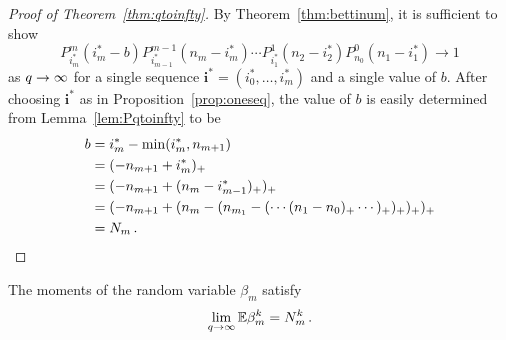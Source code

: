 
\begin{proof}[Proof of Theorem~\ref{thm:qtoinfty}]
  By Theorem~\ref{thm:bettinum}, it is sufficient to show
  \[
    P^m_{i_m^\ast}(i_m^\ast-b) P_{i^\ast_{m-1}}^{m-1}\left(n_{m} -i_m^\ast\right) \cdots
    P_{i_1^\ast}^1\left(n_2 - i_2^\ast\right) P_{n_0}^0 \left(n_1 - i_1^\ast\right) \to 1 
  \]
  as $q \rightarrow \infty$ for a single sequence $\mathbf{i}^\ast=(i_0^\ast, \ldots,
  i_m^\ast)$ and a single
  value of $b$. After choosing $\mathbf{i}^\ast$ as in Proposition~\ref{prop:oneseq},
  the value of $b$ is easily determined from Lemma~\ref{lem:Pqtoinfty} to be
	\begin{align*}
	b 	&= i_m^\ast - \min(i_m^\ast, n_{m+1})\\
		&= (-n_{m+1} + i_m^\ast)_+\\
		&= (-n_{m+1} + (n_m -i_{m-1}^\ast)_+)_+\\
		&= (-n_{m+1} + (n_m - (n_{m_1} - (\cdots (n_1 - n_0)_+ \cdots)_+)_+)_+ )_+\\
        &= N_m \, . \qedhere
	\end{align*}
\end{proof}

\begin{corollary}
  The moments of the random variable $\beta_m$ satisfy
  \[
    \lim_{q \rightarrow \infty} \mathbb{E}\beta_m^k = N_m^k \, .
  \]
\end{corollary}

